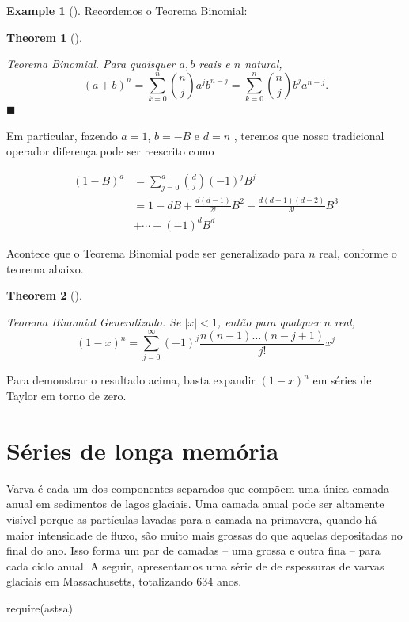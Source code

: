 \documentclass[
  letterpaper,
  DIV=11,
  numbers=noendperiod]{scrartcl}
\newenvironment{Shaded}{\begin{snugshade}}{\end{snugshade}}
\newcommand{\FunctionTok}[1]{\textcolor[rgb]{0.28,0.35,0.67}{#1}}
\newcommand{\NormalTok}[1]{\textcolor[rgb]{0.00,0.23,0.31}{#1}}
\theoremstyle{definition}
\newtheorem{example}{Example}[chapter]
\theoremstyle{definition}
\theoremstyle{plain}
\theoremstyle{plain}
\newtheorem{theorem}{Theorem}[chapter]
\theoremstyle{remark}
\begin{document}
\begin{example}[]
Recordemos o Teorema Binomial:

\begin{theorem}[]\protect\hypertarget{thm-}{}\label{thm-}

\emph{Teorema Binomial}. Para quaisquer \(a,b\) reais e \(n\) natural,
\[(a+b)^n=\sum_{k=0}^n{n\choose j}a^ jb^{n-j}=\sum_{k=0}^n{n\choose j}b^ ja^{n-j}.\]
\(\blacksquare\)

\end{theorem}

Em particular, fazendo \(a=1\), \(b=-B\) e \(d=n\) , teremos que nosso
tradicional operador diferença pode ser reescrito como

\begin{align}(1-B)^d&=\sum_{j=0}^d{
d\choose j}(-1)^jB^j\\&=1-d B + \frac{d(d-1)}{2!}B^2-\frac{d(d-1)(d-2)}{3!}B^3\\&+\cdots+(-1)^d B^d\end{align}

Acontece que o Teorema Binomial pode ser generalizado para \(n\) real,
conforme o teorema abaixo.

\begin{theorem}[]\protect\hypertarget{thm-}{}\label{thm-}

Teorema Binomial Generalizado. Se \(|x|<1\), então para qualquer \(n\)
real,
\[(1-x)^n=\sum_{j=0}^\infty (-1)^j\frac{n(n-1)\ldots(n-j+1)}{j!}x^j\]

\end{theorem}

Para demonstrar o resultado acima, basta expandir \((1-x)^n\) em séries
de Taylor em torno de zero.

\section{Séries de longa memória}\label{suxe9ries-de-longa-memuxf3ria-1}

Varva é cada um dos componentes separados que compõem uma única camada
anual em sedimentos de lagos glaciais. Uma camada anual pode ser
altamente visível porque as partículas lavadas para a camada na
primavera, quando há maior intensidade de fluxo, são muito mais grossas
do que aquelas depositadas no final do ano. Isso forma um par de camadas
-- uma grossa e outra fina -- para cada ciclo anual. A seguir,
apresentamos uma série de de espessuras de varvas glaciais em
Massachusetts, totalizando 634 anos.

\begin{Shaded}
\begin{Highlighting}[]
\FunctionTok{require}\NormalTok{(astsa)}
\end{Highlighting}
\end{Shaded}


\end{example}
\end{document}
